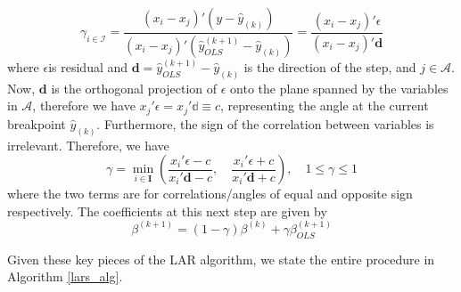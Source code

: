 \documentclass[titlepage,11pt]{article}
\begin{document}
\begin{equation*}
\gamma_{i\in \mathcal{I}}= \frac{(x_i-x_j)'(y-\hat{y}_{(k)})}{(x_i-x_j)'(\hat{y}^{(k+1)}_{OLS}-\hat{y}_{(k)})} = \frac{(x_i-x_j)'\epsilon}{(x_i-x_j)'\mathbf{d}}
\end{equation*}
where $\epsilon$is residual and $\mathbf{d}= \hat{y}^{(k+1)}_{OLS} -\hat{y}_{(k)}$ is the direction of the step, and $j\in \mathcal{A}$. Now, $\mathbf{d}$ is the orthogonal projection of $\epsilon$ onto the plane spanned by the variables in $\mathcal{A}$, therefore we have $x_j'\epsilon = x_j' \mathbb{d} \equiv c$, representing the angle at the current breakpoint $\hat{y}_{(k)}$. Furthermore, the sign of the correlation
between variables is irrelevant. Therefore, we have
\begin{equation*}
\gamma = \min_{i\in \mathbf{I}}\left(\frac{x_i' \epsilon -c}{x_i' \mathbf{d} -c}, \quad \frac{x_i' \epsilon + c}{x_i' \mathbf{d} + c}  \right)
, \quad 1\leq \gamma \leq 1
\end{equation*}
where the two terms are for correlations/angles of equal and opposite sign respectively. The coefficients at this next step are given by
\begin{equation*}
 \beta^{(k+1)} = (1-\gamma)\beta^{(k)} + \gamma\beta^{(k+1)}_{OLS}
\end{equation*}

Given these key pieces of the LAR algorithm, we state the entire procedure in Algorithm \ref{lars_alg}.
\end{document}
